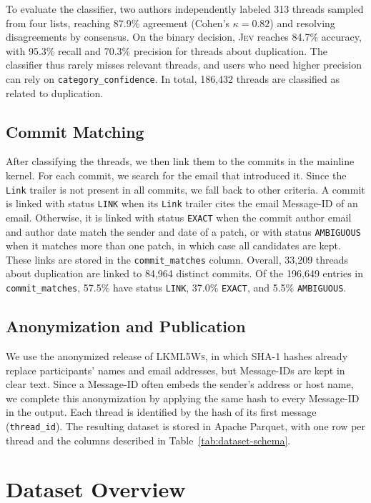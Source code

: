 \documentclass[10pt,conference]{IEEEtran}
\begin{document}
To evaluate the classifier, two authors independently labeled 313 threads sampled from four lists, reaching 87.9\% agreement (Cohen's $\kappa = 0.82$) and resolving disagreements by consensus. On the binary decision, \textsc{Jev} reaches 84.7\% accuracy, with 95.3\% recall and 70.3\% precision for threads about duplication. The classifier thus rarely misses relevant threads, and users who need higher precision can rely on \texttt{category\_confidence}. In total, 186,432 threads are classified as related to duplication.

\subsection{Commit Matching}

After classifying the threads, we then link them to the commits in the mainline kernel. For each commit, we search for the email that introduced it. Since the \texttt{Link} trailer is not present in all commits, we fall back to other criteria. A commit is linked with status \texttt{LINK} when its \texttt{Link} trailer cites the email Message-ID of an email. Otherwise, it is linked with status \texttt{EXACT} when the commit author email and author date match the sender and date of a patch, or with status \texttt{AMBIGUOUS} when it matches more than one patch, in which case all candidates are kept. These links are stored in the \texttt{commit\_matches} column. Overall, 33,209 threads about duplication are linked to 84,964 distinct commits. Of the 196,649 entries in \texttt{commit\_matches}, 57.5\% have status \texttt{LINK}, 37.0\% \texttt{EXACT}, and 5.5\% \texttt{AMBIGUOUS}.

\subsection{Anonymization and Publication}

We use the anonymized release of \textsc{LKML5Ws}, in which SHA-1 hashes already replace participants' names and email addresses, but Message-IDs are kept in clear text. Since a Message-ID often embeds the sender's address or host name, we complete this anonymization by applying the same hash to every Message-ID in the output. Each thread is identified by the hash of its first message (\texttt{thread\_id}). The resulting dataset is stored in Apache Parquet, with one row per thread and the columns described in Table~\ref{tab:dataset-schema}.


\section{Dataset Overview}
\label{sec:overview}
\end{document}
